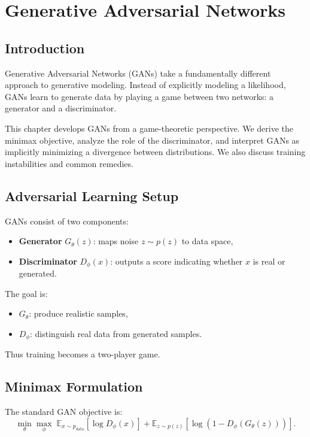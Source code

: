 \chapter{Generative Adversarial Networks}

\section{Introduction}

Generative Adversarial Networks (GANs) take a fundamentally different approach to generative modeling. Instead of explicitly modeling a likelihood, GANs learn to generate data by playing a game between two networks: a generator and a discriminator.

This chapter develops GANs from a game-theoretic perspective. We derive the minimax objective, analyze the role of the discriminator, and interpret GANs as implicitly minimizing a divergence between distributions. We also discuss training instabilities and common remedies.

\section{Adversarial Learning Setup}

GANs consist of two components:

\begin{itemize}
    \item \textbf{Generator} $G_\theta(z)$: maps noise $z \sim p(z)$ to data space,
    \item \textbf{Discriminator} $D_\phi(x)$: outputs a score indicating whether $x$ is real or generated.
\end{itemize}

The goal is:
\begin{itemize}
    \item $G_\theta$: produce realistic samples,
    \item $D_\phi$: distinguish real data from generated samples.
\end{itemize}

Thus training becomes a two-player game.

\section{Minimax Formulation}

The standard GAN objective is:
\[
\min_\theta \max_\phi \;
\mathbb{E}_{x \sim p_{\text{data}}}[\log D_\phi(x)]
+
\mathbb{E}_{z \sim p(z)}[\log(1 - D_\phi(G_\theta(z)))].
\]


